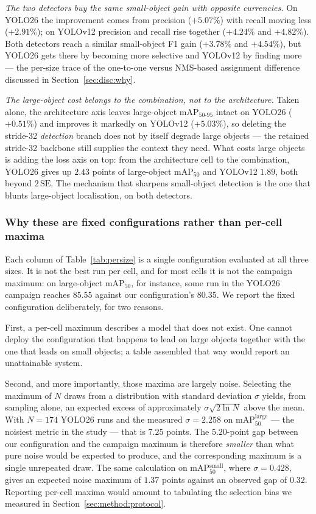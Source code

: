 \documentclass[10pt,twocolumn,a4paper]{article}
\begin{document}
\emph{The two detectors buy the same small-object gain with opposite
currencies.} On YOLO26 the improvement comes from precision ($+5.07\%$) with
recall moving less ($+2.91\%$); on YOLOv12 precision and recall rise together
($+4.24\%$ and $+4.82\%$). Both detectors reach a similar small-object F1 gain
($+3.78\%$ and $+4.54\%$), but YOLO26 gets there by becoming more selective and
YOLOv12 by finding more --- the per-size trace of the one-to-one versus
NMS-based assignment difference discussed in Section~\ref{sec:disc:why}.

\emph{The large-object cost belongs to the combination, not to the
architecture.} Taken alone, the architecture axis leaves large-object
mAP$_{50\text{-}95}$ intact on YOLO26 ($+0.51\%$) and improves it markedly on
YOLOv12 ($+5.03\%$), so deleting the stride-32 \emph{detection} branch does not
by itself degrade large objects --- the retained stride-32 backbone still
supplies the context they need. What costs large objects is adding the loss axis
on top: from the architecture cell to the combination, YOLO26 gives up $2.43$
points of large-object mAP$_{50}$ and YOLOv12 $1.89$, both beyond
$2\,\mathrm{SE}$. The mechanism that sharpens small-object detection is the one
that blunts large-object localisation, on both detectors.

\subsubsection*{Why these are fixed configurations rather than per-cell maxima}

Each column of Table~\ref{tab:persize} is a single configuration evaluated at
all three sizes. It is not the best run per cell, and for most cells it is not
the campaign maximum: on large-object mAP$_{50}$, for instance, some run in the
YOLO26 campaign reaches $85.55$ against our configuration's $80.35$. We report
the fixed configuration deliberately, for two reasons.

First, a per-cell maximum describes a model that does not exist. One cannot
deploy the configuration that happens to lead on large objects together with the
one that leads on small objects; a table assembled that way would report an
unattainable system.

Second, and more importantly, those maxima are largely noise. Selecting the
maximum of $N$ draws from a distribution with standard deviation $\sigma$ yields,
from sampling alone, an expected excess of approximately
$\sigma\sqrt{2\ln N}$ above the mean. With $N=174$ YOLO26 runs and the measured
$\sigma = 2.258$ on mAP$_{50}^{\text{large}}$ --- the noisiest metric in the
study --- that is $7.25$ points. The $5.20$-point gap between our configuration
and the campaign maximum is therefore \emph{smaller} than what pure noise would
be expected to produce, and the corresponding maximum is a single unrepeated
draw. The same calculation on mAP$_{50}^{\text{small}}$, where
$\sigma = 0.428$, gives an expected noise maximum of $1.37$ points against an
observed gap of $0.32$. Reporting per-cell maxima would amount to tabulating the
selection bias we measured in Section~\ref{sec:method:protocol}.
\end{document}
